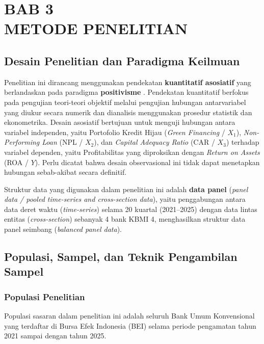 \documentclass[12pt,a4paper]{article}
\numberwithin{equation}{section}
\begin{document}
\newpage
\setcounter{section}{0}
\section*{BAB 3\\[0.3cm]METODE PENELITIAN}
\setcounter{section}{3}
\setcounter{subsection}{0}
\setcounter{equation}{0}

\subsection{Desain Penelitian dan Paradigma Keilmuan}

\noindent
Penelitian ini dirancang menggunakan pendekatan \textbf{kuantitatif asosiatif} yang berlandaskan pada paradigma \textbf{positivisme} \citep{Sugiyono2019}. Pendekatan kuantitatif berfokus pada pengujian teori-teori objektif melalui pengujian hubungan antarvariabel yang diukur secara numerik dan dianalisis menggunakan prosedur statistik dan ekonometrika. Desain asosiatif bertujuan untuk menguji hubungan antara variabel independen, yaitu Portofolio Kredit Hijau (\emph{Green Financing} / $X_1$), \emph{Non-Performing Loan} (NPL / $X_2$), dan \emph{Capital Adequacy Ratio} (CAR / $X_3$) terhadap variabel dependen, yaitu Profitabilitas yang diproksikan dengan \emph{Return on Assets} (ROA / $Y$). Perlu dicatat bahwa desain observasional ini tidak dapat menetapkan hubungan sebab-akibat secara definitif.

\noindent
Struktur data yang digunakan dalam penelitian ini adalah \textbf{data panel} (\emph{panel data / pooled time-series and cross-section data}), yaitu penggabungan antara data deret waktu (\emph{time-series}) selama 20 kuartal (2021--2025) dengan data lintas entitas (\emph{cross-section}) sebanyak 4 bank KBMI 4, menghasilkan struktur data panel seimbang (\emph{balanced panel data}).

\subsection{Populasi, Sampel, dan Teknik Pengambilan Sampel}

\subsubsection{Populasi Penelitian}
\noindent
Populasi sasaran dalam penelitian ini adalah seluruh Bank Umum Konvensional yang terdaftar di Bursa Efek Indonesia (BEI) selama periode pengamatan tahun 2021 sampai dengan tahun 2025.
\end{document}
